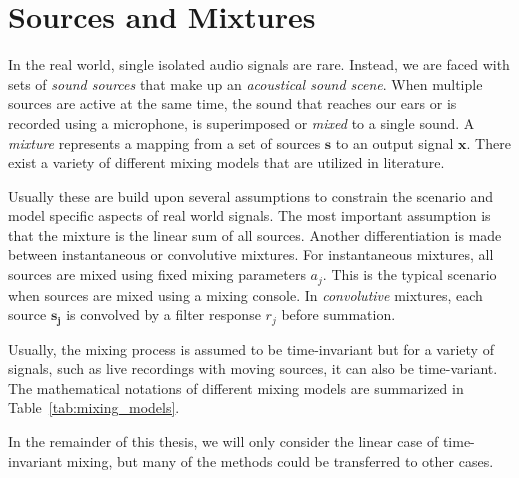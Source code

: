 \hypertarget{sources-and-mixtures}{%
\section{Sources and Mixtures}\label{sources-and-mixtures}}

In the real world, single isolated audio signals are rare.
Instead, we are faced with sets of \emph{sound sources} that make up an \emph{acoustical sound scene}.
When multiple sources are active at the same time, the sound that reaches our ears or is recorded using a microphone, is superimposed or \emph{mixed} to a single sound.
A \emph{mixture} represents a mapping from a set of sources \(\mathbf{s}\) to an output signal \(\mathbf{x}\).
There exist a variety of different mixing models that are utilized in literature.
\par
Usually these are build upon several assumptions to constrain the scenario and model specific aspects of real world signals.
The most important assumption is that the mixture is the linear sum of all sources.
Another differentiation is made between instantaneous or convolutive mixtures.
For instantaneous mixtures, all sources are mixed using fixed mixing parameters \(a_j\).
This is the typical scenario when sources are mixed using a mixing console.
In \emph{convolutive} mixtures, each source \(\mathbf{s_j}\) is convolved by a filter response \(r_j\) before summation.
\par
Usually, the mixing process is assumed to be time-invariant but for a variety of signals, such as live recordings with moving sources, it can also be time-variant.
The mathematical notations of different mixing models are summarized in Table~\ref{tab:mixing_models}.
\par
In the remainder of this thesis, we will only consider the linear case of time-invariant mixing, but many of the methods could be transferred to other cases.

